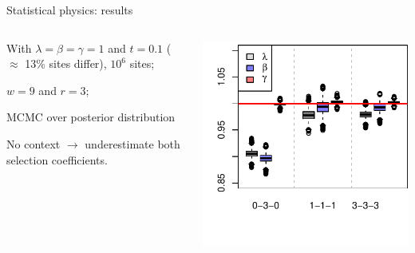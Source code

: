 \documentclass[smaller]{beamer}
\begin{document}
\begin{frame}{Statistical physics: results}
  \begin{columns}[c]
    \begin{column}{.4\textwidth}

      With $\lambda = \beta = \gamma = 1$ and $t = 0.1$  ($\approx$ 13\% sites differ), $10^6$ sites; \\

      \vspace{1em}

      $w=9$ and $r=3$;

      \vspace{1em}

      MCMC over posterior distribution

      \vspace{2em}

      No context $\longrightarrow$ underestimate both selection coefficients.

    \end{column}
    \begin{column}{.6\textwidth}

  \includegraphics[width=\textwidth]{../../writeup-plots/selsims-2013-05-28-17-12-0275615-estimate-boxplots}

    \end{column}
  \end{columns}

\end{frame}
\end{document}
